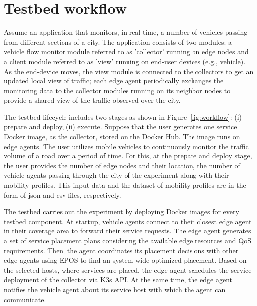 \documentclass[conference]{IEEEtran}
\begin{document}
\section{Testbed workflow}\label{sec:workflow}
\par Assume an application that monitors, in real-time, a number of vehicles passing from different sections of a city. The application consists of two modules: a vehicle flow monitor module referred to as 'collector' running on edge nodes and a client module referred to as 'view' running on end-user devices (e.g., vehicle). As the end-device moves, the view module is connected to the collectors to get an updated local view of traffic; each edge agent periodically exchanges the monitoring data to the collector modules running on its neighbor nodes to provide a shared view of the traffic observed over the city. 

\par The testbed lifecycle includes two stages as shown in Figure~\ref{fig:workflow}: (i) prepare and deploy, (ii) execute. Suppose that the user generates one service Docker image, as the collector, stored on the Docker Hub. The image runs on edge agents. The user utilizes mobile vehicles to continuously monitor the traffic volume of a road over a period of time. For this, at the prepare and deploy stage, the user provides the number of edge nodes and their location, the number of vehicle agents passing through the city of the experiment along with their mobility profiles. This input data and the dataset of mobility profiles are in the form of json and csv files, respectively. 

\par The testbed carries out the experiment by deploying Docker images for every testbed component.
At startup, vehicle agents connect to their closest edge agent in their coverage area to forward their service requests. The edge agent generates a set of service placement plans considering the available edge resources and QoS requirements. Then, the agent coordinates its placement decisions with other edge agents using EPOS to find an system-wide optimized placement. Based on the selected hosts, where services are placed, the edge agent schedules the service deployment of the collector via K3s API. At the same time, the edge agent notifies the vehicle agent about its service host with which the agent can communicate.
\end{document}
